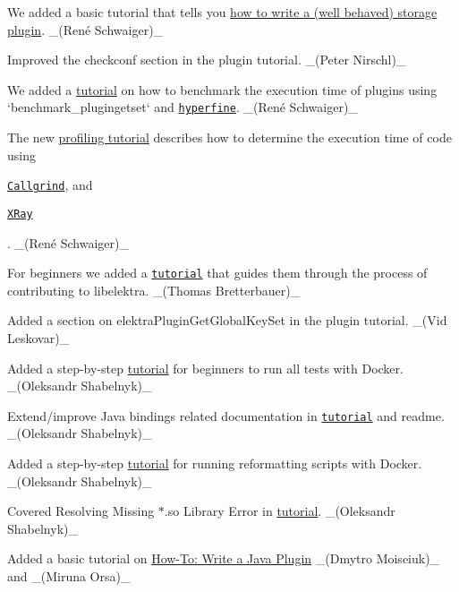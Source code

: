 \begin{DoxyItemize}
\item We added a basic tutorial that tells you \hyperlink{doc_tutorials_storage-plugins_md}{how to write a (well behaved) storage plugin}. \+\_\+(René Schwaiger)\+\_\+
\item Improved the {\ttfamily checkconf} section in the plugin tutorial. \+\_\+(\+Peter Nirschl)\+\_\+
\item We added a \hyperlink{doc_tutorials_benchmarking_md}{tutorial} on how to benchmark the execution time of plugins using `benchmark\+\_\+plugingetset` and \href{https://github.com/sharkdp/hyperfine}{\tt hyperfine}. \+\_\+(René Schwaiger)\+\_\+
\item The new \hyperlink{doc_tutorials_profiling_md}{profiling tutorial} describes how to determine the execution time of code using
\begin{DoxyItemize}
\item \href{http://valgrind.org/docs/manual/cl-manual.html}{\tt Callgrind}, and
\item \href{https://llvm.org/docs/XRay.html}{\tt X\+Ray}
\end{DoxyItemize}

. \+\_\+(René Schwaiger)\+\_\+
\item For beginners we added a \href{https://www.libelektra.org/tutorials/contributing-with-clion}{\tt tutorial} that guides them through the process of contributing to libelektra. \+\_\+(\+Thomas Bretterbauer)\+\_\+
\item Added a section on {\ttfamily elektra\+Plugin\+Get\+Global\+Key\+Set} in the plugin tutorial. \+\_\+(\+Vid Leskovar)\+\_\+
\item Added a step-\/by-\/step \hyperlink{doc_tutorials_run_all_tests_with_docker_md}{tutorial} for beginners to run all tests with Docker. \+\_\+(\+Oleksandr Shabelnyk)\+\_\+
\item Extend/improve Java bindings related documentation in \href{https://www.libelektra.org/tutorials/java-bindings}{\tt tutorial} and readme. \+\_\+(\+Oleksandr Shabelnyk)\+\_\+
\item Added a step-\/by-\/step \hyperlink{doc_tutorials_run_reformatting_script_with_docker_md}{tutorial} for running reformatting scripts with Docker. \+\_\+(\+Oleksandr Shabelnyk)\+\_\+
\item Covered Resolving Missing $\ast$.so Library Error in \hyperlink{doc_tutorials_contributing-clion_md}{tutorial}. \+\_\+(\+Oleksandr Shabelnyk)\+\_\+
\item Added a basic tutorial on \hyperlink{doc_tutorials_java-plugins_md}{How-\/\+To\+: Write a Java Plugin} \+\_\+(\+Dmytro Moiseiuk)\+\_\+ and \+\_\+(\+Miruna Orsa)\+\_\+
\end{DoxyItemize}


